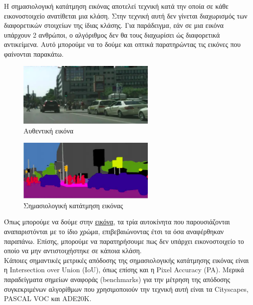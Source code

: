 \documentclass[12pt]{article}
\begin{document}
Η σημασιολογική κατάτμηση εικόνας αποτελεί τεχνική κατά την οποία σε κάθε εικονοστοιχείο ανατίθεται μια κλάση. Στην τεχνική αυτή δεν γίνεται διαχωρισμός των διαφορετικών στοιχείων της ίδιας κλάσης. Για παράδειγμα, εάν σε μια εικόνα υπάρχουν 2 ανθρώποι, ο αλγόριθμος δεν θα τους διαχωρίσει ώς διαφορετικά αντικείμενα. Αυτό μπορούμε να το δούμε και οπτικά παρατηρώντας τις εικόνες που φαίνονται παρακάτω.

\begin{figure}[h!]
  \centering
  \includegraphics[width=0.6\textwidth]{images/figure0.png} %
  \caption{Αυθεντική εικόνα}
  \label{figure 0}
\end{figure}

\begin{figure}[h!]
  \centering
  \includegraphics[width=0.6\textwidth]{images/figure1.png} %
  \caption{Σημασιολογική κατάτμηση εικόνας}
  \label{figure 1}
\end{figure}

Όπως μπορούμε να δούμε στην \hyperref[figure 1]{εικόνα}, τα τρία αυτοκίνητα που παρουσιάζονται αναπαριστόνται με το ίδιο χρώμα, επιβεβαιώνοντας έτσι τα όσα αναφέρθηκαν παραπάνω. Επίσης, μπορούμε να παρατηρήσουμε πως δεν υπάρχει εικονοστοιχείο το οποίο να μην αντιστοιχήστηκε σε κάποια κλάση. \\

Κάποιες σημαντικές μετρικές απόδοσης της σημασιολογικής κατάτμησης εικόνας είναι η Intersection over Union (IoU), όπως επίσης και η Pixel Accuracy (PA). Μερικά παραδείγματα σημείων αναφοράς (benchmarks) για την μέτρηση της απόδοσης συγκεκριμένων αλγορίθμων που χρησιμοποιούν την τεχνική αυτή είναι τα Cityscapes, PASCAL VOC και ADE20K.
\end{document}
